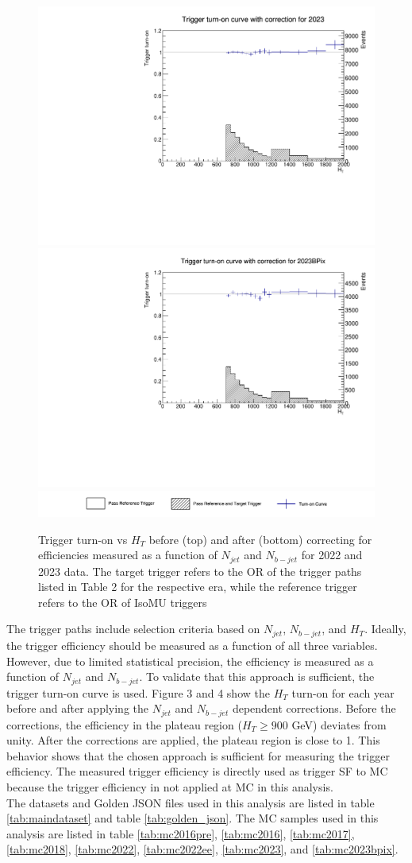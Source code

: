 \documentclass[twoside]{article}
\begin{document}
\begin{figure}[!t]
    \includegraphics[width=.24\columnwidth]{plots/Trigger/turnOn_2023_Coron.pdf}
    \includegraphics[width=.24\columnwidth]{plots/Trigger/turnOn_2023BPix_Coron.pdf}
    \includegraphics[width=.88\columnwidth]{plots/Trigger/Legend.png}

    \caption{Trigger turn-on vs $H_T$ before (top) and after (bottom) correcting for efficiencies measured as a function of $N_{jet}$ and $N_{b-jet}$ for 2022 and 2023 data. The target trigger refers to the OR of the trigger paths listed in Table 2 for the respective era, while the reference trigger refers to the OR of IsoMU triggers}
\end{figure}

The trigger paths include selection criteria based on $N_{jet}$, $N_{b-jet}$, and $H_{T}$. Ideally, the trigger efficiency should be measured as a function of all three variables. However, due to limited statistical precision, the efficiency is measured as a function of $N_{jet}$ and $N_{b-jet}$. To validate that this approach is sufficient, the trigger turn-on curve is used. Figure 3 and 4 show the $H_T$ turn-on for each year before and after applying the $N_{jet}$ and $N_{b-jet}$ dependent corrections. Before the corrections, the efficiency in the plateau region ($H_T \geq 900$ GeV) deviates from unity. After the corrections are applied, the plateau region is close to 1. This behavior shows that the chosen approach is sufficient for measuring the trigger efficiency. The measured trigger efficiency is directly used as trigger SF to MC because the trigger efficiency in not applied at MC in this analysis.\\

The datasets and Golden JSON files used in this analysis are listed in table \ref{tab:maindataset} and table \ref{tab:golden_json}. The MC samples used in this analysis are listed in table \ref{tab:mc2016pre}, \ref{tab:mc2016}, \ref{tab:mc2017}, \ref{tab:mc2018}, \ref{tab:mc2022}, \ref{tab:mc2022ee}, \ref{tab:mc2023}, and \ref{tab:mc2023bpix}.
\end{document}
